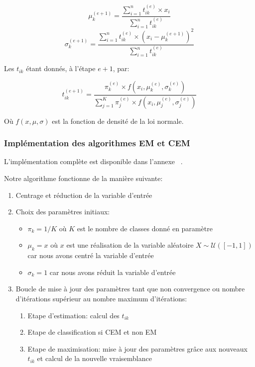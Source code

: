 \documentclass{article}
\begin{document}
\begin{multicols}{2}
\begin{equation}
\mu_k^{(e + 1)} = \frac
    {\sum_{i = 1}^n t_{ik}^{(e)} \times x_i}
    {\sum_{i = 1}^n t_{ik}^{(e)}}
\end{equation}
\begin{equation}
\sigma_k^{(e + 1)} = \frac
    {\sum_{i = 1}^n t_{ik}^{(e)} \times (x_i - \mu_k^{(e + 1)})^2}
    {\sum_{i = 1}^n t_{ik}^{(e)}}
\end{equation}

Les $t_{ik}$ étant donnés, à l'étape $e + 1$, par:

\begin{equation}
t_{ik}^{(e + 1)} = \frac
    {\pi_k^{(e)} \times f(x_i, \mu_k^{(e)}, \sigma_k^{(e)})}
    {\sum_{j = 1}^K \pi_j^{(e)} \times f(x_i, \mu_j^{(e)}, \sigma_j^{(e)})}
\end{equation}

Où $f(x, \mu, \sigma)$ est la fonction de densité de la loi normale.

\subsubsection{Implémentation des algorithmes EM et CEM}\label{subsubsec:ex212}

L'implémentation complète est disponible dans l'annexe ~.

Notre algorithme fonctionne de la manière suivante:

\begin{enumerate}
\item Centrage et réduction de la variable d'entrée
\item Choix des paramètres initiaux:
    \begin{itemize}
        \item $\pi_k = 1 / K$ où $K$ est le nombre de classes donné en
            paramètre
        \item $\mu_k = x$ où $x$ est une réalisation de la variable
            aléatoire $X \sim \mathscr{U}([-1, 1])$ car nous avons centré la
            variable d'entrée
        \item $\sigma_k = 1$ car nous avons réduit la variable d'entrée
    \end{itemize}
\item Boucle de mise à jour des paramètres tant que non convergence ou
    nombre d'itérations supérieur au nombre maximum d'itérations:
    \begin{enumerate}
        \item Etape d'estimation: calcul des $t_{ik}$
        \item Etape de classification si CEM et non EM
        \item Etape de maximisation: mise à jour des paramètres grâce
            aux nouveaux $t_{ik}$ et calcul de la nouvelle vraisemblance
    \end{enumerate}
\end{enumerate}


\end{multicols}
\end{document}
